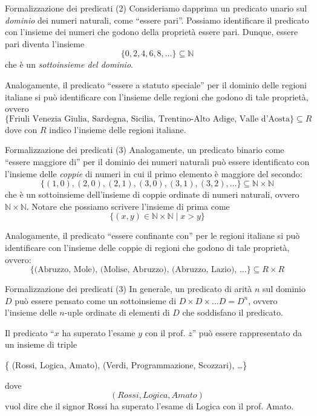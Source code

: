 \documentclass[aspectratio=169,10pt,dvipsnames,xcolor=table,handout]{beamer}
\begin{document}
\begin{frame}[fragile]{Formalizzazione dei predicati (2)}
    Consideriamo dapprima un predicato unario sul \emph{dominio} dei numeri naturali, come ``essere pari''. Possiamo identificare il predicato con l'insieme dei numeri che godono della proprietà essere pari. Dunque, essere pari diventa l'insieme
    \[
        \{ 0, 2, 4, 6, 8, \ldots \} \subseteq \mathbb N
    \]
    che è un \emph{sottoinsieme del dominio}.

    \pause
    \medskip
    Analogamente, il predicato ``essere a statuto speciale'' per il dominio delle regioni italiane si può identificare con l'insieme delle regioni che godono di tale proprietà, ovvero
    \[
        \{ \text{Friuli Venezia Giulia, Sardegna, Sicilia, Trentino-Alto Adige, Valle d'Aosta} \} \subseteq R
    \]
    dove con $R$ indico l'insieme delle regioni italiane.
\end{frame}

\begin{frame}[fragile]{Formalizzazione dei predicati (3)}
    Analogamente, un predicato binario come ``essere maggiore di'' per il dominio dei numeri naturali può essere identificato con l'insieme delle \emph{coppie} di numeri in cui il primo elemento è maggiore del secondo:
    \[
        \{ (1,0), (2,0), (2,1), (3,0), (3,1), (3,2), \ldots \} \subseteq \mathbb N \times \mathbb N
    \]
    che è un sottoinsieme dell'insieme di \alert{coppie ordinate} di numeri naturali, ovvero $ \mathbb N \times \mathbb N$. Notare che possiamo scrivere l'insieme di prima come
    \[
        \{ (x,y) \in \mathbb N \times \mathbb N \mid x > y \}
    \]

    \pause
    \medskip
    Analogamente, il predicato ``essere confinante con'' per le regioni italiane si può identificare con l'insieme delle coppie di regioni che godono di tale proprietà, ovvero:
    \[
        \{ \text{(Abruzzo, Mole), (Molise, Abruzzo), (Abruzzo, Lazio),  \ldots } \} \subseteq R \times R
    \]
\end{frame}

\begin{frame}{Formalizzazione dei predicati (3)}
    In generale, un predicato di arità $n$ sul dominio $D$ può essere pensato come un sottoinsieme di $D \times D \times ... D = D^n$, ovvero l'insieme delle $n$-uple ordinate di elementi di $D$ che soddisfano il predicato.

    \pause
    \begin{example}
        Il predicato ``$x$ ha superato l'esame $y$ con il prof. $z$'' può essere rappresentato da un insieme di triple
        \begin{center}
            \{ (Rossi, Logica, Amato), (Verdi, Programmazione, Scozzari), \ldots \}
        \end{center}
        dove
        \[ (Rossi, Logica, Amato) \]
        vuol dire che il signor Rossi ha superato l'esame di Logica con il prof. Amato.
    \end{example}
\end{frame}
\end{document}
